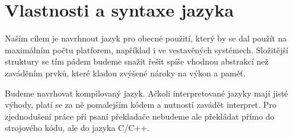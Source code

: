\begin{comment}
Mou hlavní motivací je nespokojenost se stávajícími programovacími jazyky. Programování mám jako koníčka už od nějakých dvanácti let, a tak jsem ještě před nastoupením na FIT získal nějaké zkušenosti z psaní aplikací v Object Pascalu (Delphi), C++ (Qt, SDL + OpenGL) a PHP (webové aplikace). FIT pak můj repertoár (i když jen rámcově) rozšířil na valnou většinu dnes používaných jazyků. Bohužel jsem ale nenarazil na žádný, který by splňoval mé požadavky. Rozhodl jsem se tedy využít nutnost napsání bakalářské práce k~uskutečnění mého dlouholetého snu.

\paragraph{Jazyk D}
Mému srdci nejbližší jazyk, na který jsem ve svém pátrání narazil, byl jazyk D. Jedná se o kompilovaný jazyk vycházející z C++ (binárky jsou do jisté míry kompatibilní) s~velice podobnou syntaxí. Největší rozdíly jsou modulový systém\footnote{\url{http://dlang.org/spec/module.html}} (zdrojový kód je rozdělen do modulů, které se vzájemně, i rekurzivně, importují; odpadá nutnost psát hlavičkové soubory), značně rozšířená funkčnost metaprogramování s šablonami a~rozšířená schopnost vykonávat funkce za doby kompilace.

D mi byl velikou inspirací při navrhování mého jazyka. Bohužel i v D jsem narazil na strop možnosti (ačkoli byl značně výš než třeba v C++), kdy některé věci nešly napsat tak jednoduše, jak bych chtěl. Tento jazyk však dokazuje, že tato bariéra může být mnohem dál. Já ji chci ve svém jazyku ještě více posunout. 
\end{comment}

\chapter{Vlastnosti a syntaxe jazyka}
Naším cílem je navrhnout jazyk pro obecné použití, který by se dal použít na maximálním počtu platforem, například i ve vestavěných systémech. Složitější struktury se tím pádem budeme snažit řešit spíše vhodnou abstrakcí než zaváděním prvků, které kladou zvýšené nároky na výkon a paměť.

Budeme navrhovat kompilovaný jazyk. Ačkoli interpretované jazyky mají jisté výhody, platí se za ně pomalejším kódem a nutností zavádět interpret. Pro zjednodušení práce při psaní překladače nebudeme ale překládat přímo do strojového kódu, ale do jazyka C/C++.

